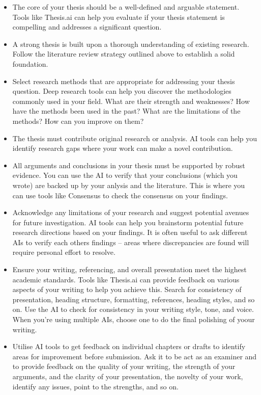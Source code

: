 \documentclass[
  10t,
]{article}
\providecommand{\tightlist}{%
  \setlength{\itemsep}{0pt}\setlength{\parskip}{0pt}}
\begin{document}
\begin{itemize}
\tightlist
\item
  The core of your thesis should be a well-defined and arguable
  statement. Tools like Thesis.ai can help you evaluate if your thesis
  statement is compelling and addresses a significant question.
\item
  A strong thesis is built upon a thorough understanding of existing
  research. Follow the literature review strategy outlined above to
  establish a solid foundation.
\item
  Select research methods that are appropriate for addressing your
  thesis question. Deep research tools can help you discover the
  methodologies commonly used in your field. What are their strength and
  weaknesses? How have the methods been used in the past? What are the
  limitations of the methods? How can you improve on them?
\item
  The thesis must contribute original research or analysis. AI tools can
  help you identify research gaps where your work can make a novel
  contribution.
\item
  All arguments and conclusions in your thesis must be supported by
  robust evidence. You can use the AI to verify that your conclusions
  (which you wrote) are backed up by your anlysis and the literature.
  This is where you can use tools like Consensus to check the consensus
  on your findings.
\item
  Acknowledge any limitations of your research and suggest potential
  avenues for future investigation. AI tools can help you brainstorm
  potential future research directions based on your findings. It is
  often useful to ask different AIs to verify each others findings --
  areas where discrepancies are found will require personal effort to
  resolve.
\item
  Ensure your writing, referencing, and overall presentation meet the
  highest academic standards. Tools like Thesis.ai can provide feedback
  on various aspects of your writing to help you achieve this. Search
  for consistency of presentation, heading structure, formatting,
  references, heading styles, and so on. Use the AI to check for
  consistency in your writing style, tone, and voice. When you're using
  multiple AIs, choose one to do the final polishing of yoour writing.
\item
  Utilise AI tools to get feedback on individual chapters or drafts to
  identify areas for improvement before submission. Ask it to be act as
  an examiner and to provide feedback on the quality of your writing,
  the strength of your arguments, and the clarity of your presentation,
  the novelty of your work, identify any issues, point to the strengths,
  and so on.
\end{itemize}
\end{document}
